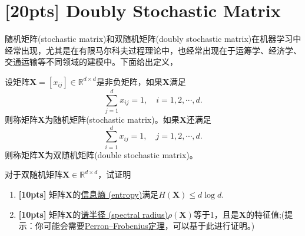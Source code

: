 \documentclass[a4paper,UTF8]{article}
\numberwithin{equation}{section}
\begin{document}
\newpage
\section{[20pts] Doubly Stochastic Matrix}
随机矩阵(stochastic matrix)和双随机矩阵(doubly stochastic matrix)在机器学习中经常出现，尤其是在有限马尔科夫过程理论中，也经常出现在于运筹学、经济学、交通运输等不同领域的建模中。下面给出定义，
\begin{def-box}[随机矩阵]
设矩阵$\mathbf{X}=[x_{ij}]\in \mathbb{R}^{d\times d}$是非负矩阵，如果$\mathbf{X}$满足
\begin{equation}
\label{eq-sto-matrix}
\sum_{j=1}^d x_{ij} = 1,\quad i=1,2,\cdots,d.
\end{equation}
则称矩阵$\mathbf{X}$为随机矩阵(stochastic matrix)。如果$\mathbf{X}$还满足
\begin{equation}
\label{eq-double-sto-matrix}
\sum_{i=1}^d x_{ij} = 1,\quad j=1,2,\cdots,d.
\end{equation}
则称矩阵$\mathbf{X}$为双随机矩阵(double stochastic matrix)。
\end{def-box}
对于双随机矩阵$\mathbf{X} \in \mathbb{R}^{d\times d}$，试证明
\begin{enumerate}[ {(}1{)}]
\item \textbf{[10pts]} 矩阵$\mathbf{X}$的\href{https://en.wikipedia.org/wiki/Entropy_(information_theory)}{信息熵 (entropy)}满足$H(\mathbf{X}) \leq d\log d$.
\item \textbf{[10pts]} 矩阵$\mathbf{X}$的\href{https://en.wikipedia.org/wiki/Spectral_radius}{谱半径 (spectral radius)}$\rho(\mathbf{X})$等于1，且是$\mathbf{X}$的特征值;(提示：你可能会需要\href{https://en.wikipedia.org/wiki/Perron%E2%80%93Frobenius_theorem}{Perron–Frobenius定理}，可以基于此进行证明。)
\end{enumerate}
\end{document}
